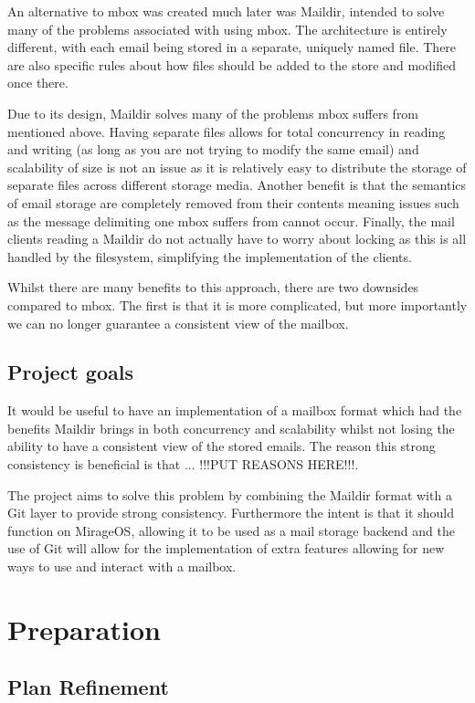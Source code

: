 \documentclass[12pt,a4paper,twoside,openright]{report}
\begin{document}
An alternative to mbox was created much later was Maildir, intended to solve many of the problems associated with using mbox. The architecture is entirely different, with each email being stored in a separate, uniquely named file. There are also specific rules about how files should be added to the store and modified once there.

Due to its design, Maildir solves many of the problems mbox suffers from mentioned above. Having separate files allows for total concurrency in reading and writing (as long as you are not trying to modify the same email) and scalability of size is not an issue as it is relatively easy to distribute the storage of separate files across different storage media. Another benefit is that the semantics of email storage are completely removed from their contents meaning issues such as the message delimiting one mbox suffers from cannot occur. Finally, the mail clients reading a Maildir do not actually have to worry about locking as this is all handled by the filesystem, simplifying the implementation of the clients.

Whilst there are many benefits to this approach, there are two downsides compared to mbox. The first is that it is more complicated, but more importantly we can no longer guarantee a consistent view of the mailbox.

\section{Project goals}

It would be useful to have an implementation of a mailbox format which had the benefits Maildir brings in both concurrency and scalability whilst not losing the ability to have a consistent view of the stored emails. The reason this strong consistency is beneficial is that ... !!!PUT REASONS HERE!!!.

The project aims to solve this problem by combining the Maildir format with a Git layer to provide strong consistency. Furthermore the intent is that it should function on MirageOS, allowing it to be used as a mail storage backend and the use of Git will allow for the implementation of extra features allowing for new ways to use and interact with a mailbox.

\chapter{Preparation}

\section{Plan Refinement}
\end{document}
